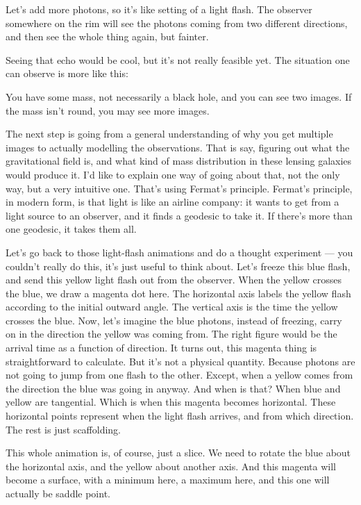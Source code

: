 Let's add more photons, so it's like setting of a light flash.  The
observer somewhere on the rim will see the photons coming from two
different directions, and then see the whole thing again, but fainter.

Seeing that echo would be cool, but it's not really feasible yet.  The
situation one can observe is more like this:

\next

You have some mass, not necessarily a black hole, and you can see two
images.  If the mass isn't round, you may see more images.

\next

The next step is going from a general understanding of why you get
multiple images to actually modelling the observations.  That is say,
figuring out what the gravitational field is, and what kind of mass
distribution in these lensing galaxies would produce it.  I'd like to
explain one way of going about that, not the only way, but a very
intuitive one.  That's using Fermat's principle.  Fermat's principle,
in modern form, is that light is like an airline company: it wants to
get from a light source to an observer, and it finds a geodesic to
take it.  If there's more than one geodesic, it takes them all.

\next

Let's go back to those light-flash animations and do a thought
experiment --- you couldn't really do this, it's just useful to think
about.  Let's freeze this blue flash, and send this yellow light flash
out from the observer.  When the yellow crosses the blue, we draw a
magenta dot here.  The horizontal axis labels the yellow flash
according to the initial outward angle.  The vertical axis is the time
the yellow crosses the blue.  Now, let's imagine the blue photons,
instead of freezing, carry on in the direction the yellow was coming
from.  The right figure would be the arrival time as a function of
direction.  It turns out, this magenta thing is straightforward to
calculate.  But it's not a physical quantity.  Because photons are not
going to jump from one flash to the other.  Except, when a yellow
comes from the direction the blue was going in anyway.  And when is
that?  When blue and yellow are tangential.  Which is when this
magenta becomes horizontal.  These horizontal points represent when
the light flash arrives, and from which direction.  The rest is just
scaffolding.

This whole animation is, of course, just a slice.  We need to rotate
the blue about the horizontal axis, and the yellow about another axis.
And this magenta will become a surface, with a minimum here, a maximum
here, and this one will actually be saddle point.

